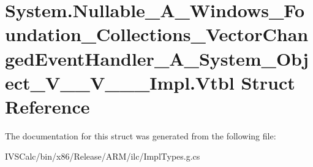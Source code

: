 \hypertarget{struct_system_1_1_nullable___a___windows___foundation___collections___vector_changed_event_handl091f67f8bee489f764f301c463b434a1}{}\section{System.\+Nullable\+\_\+\+A\+\_\+\+Windows\+\_\+\+Foundation\+\_\+\+Collections\+\_\+\+Vector\+Changed\+Event\+Handler\+\_\+\+A\+\_\+\+System\+\_\+\+Object\+\_\+\+V\+\_\+\+\_\+\+V\+\_\+\+\_\+\+\_\+\+Impl.\+Vtbl Struct Reference}
\label{struct_system_1_1_nullable___a___windows___foundation___collections___vector_changed_event_handl091f67f8bee489f764f301c463b434a1}


The documentation for this struct was generated from the following file\+:\begin{DoxyCompactItemize}
\item 
I\+V\+S\+Calc/bin/x86/\+Release/\+A\+R\+M/ilc/Impl\+Types.\+g.\+cs\end{DoxyCompactItemize}
